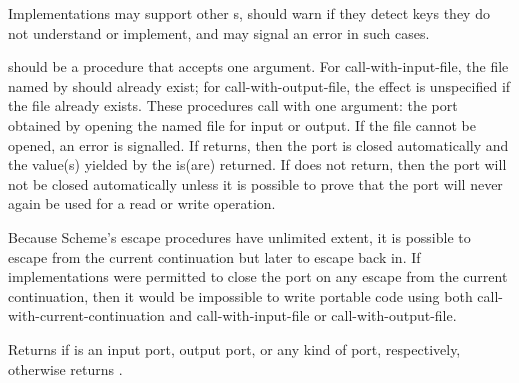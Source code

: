 Implementations may support other s, should warn if they
detect keys they do not understand or implement, and may signal an
error in such cases.

\begin{entry}{%
}

 should be a procedure that accepts one argument.
For {\cf call-with-input-file},
the file named by  should already exist; for
{\cf call-with-output-file},
the effect is unspecified if the file
already exists. These procedures call  with one argument: the
port obtained by opening the named file for input or output.  If the
file cannot be opened, an error is signalled.  If  returns,
then the port is closed automatically and the value(s) yielded by the
 is(are) returned.  If  does not return, then 
the port will not be closed automatically unless it is possible to
prove that the port will never again be used for a read or write
operation.

\begin{rationale}
Because Scheme's escape procedures have unlimited extent, it  is
possible to escape from the current continuation but later to escape back in. 
If implementations were permitted to close the port on any escape from the
current continuation, then it would be impossible to write portable code using
both {\cf call-with-current-continuation} and {\cf call-with-input-file} or
{\cf call-with-output-file}.
\end{rationale} 
\end{entry}


\begin{entry}{%
}

Returns \schtrue{} if  is an input port, output port, or any
kind of port, respectively, otherwise returns \schfalse.


\end{entry}

